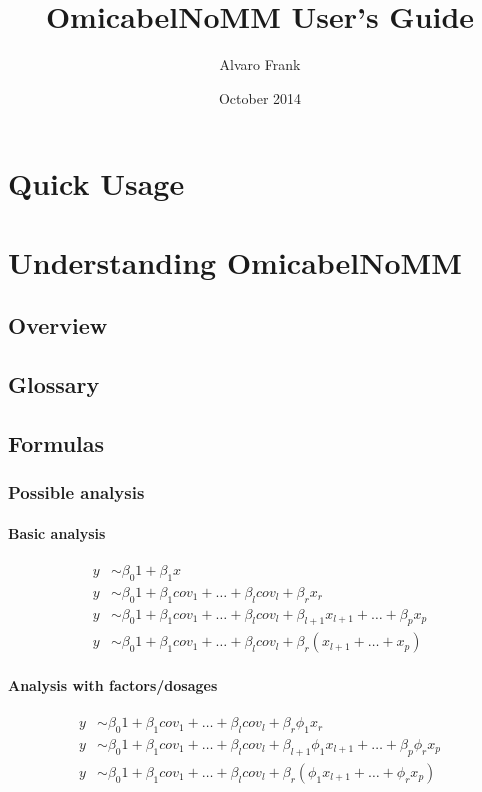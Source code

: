 \documentclass{report}
\begin{document}
\title{OmicabelNoMM User's Guide}
\author{Alvaro Frank}
\date{October 2014}
\maketitle


\chapter{Quick Usage}


\chapter{Understanding OmicabelNoMM}

\section{Overview}

\section{Glossary}

\section{Formulas}

\subsection{Possible analysis}

\subsubsection{Basic analysis}
\begin{align}
y &\sim \beta_0 1 + \beta_1 x \\
y &\sim \beta_0 1 + \beta_1 cov_1 + \dots + \beta_l cov_l + \beta_r x_r\\
y &\sim \beta_0 1 + \beta_1 cov_1 + \dots + \beta_l cov_l + \beta_{l+1} x_{l+1}  + \dots + \beta_p x_p\\
y &\sim \beta_0 1 + \beta_1 cov_1 + \dots + \beta_l cov_l + \beta_{r} \left(x_{l+1}  + \dots +  x_p\right)
\end{align}

\subsubsection{Analysis with factors/dosages}
\begin{align}
y &\sim \beta_0 1 + \beta_1 cov_1 + \dots + \beta_l cov_l + \beta_r \phi_1 x_r\\
y &\sim \beta_0 1 + \beta_1 cov_1 + \dots + \beta_l cov_l + \beta_{l+1}  \phi_1 x_{l+1}  + \dots + \beta_p  \phi_r x_p\\
y &\sim \beta_0 1 + \beta_1 cov_1 + \dots + \beta_l cov_l + \beta_{r} \left( \phi_1 x_{l+1}  + \dots +   \phi_r x_p\right)
\end{align}
\end{document}
